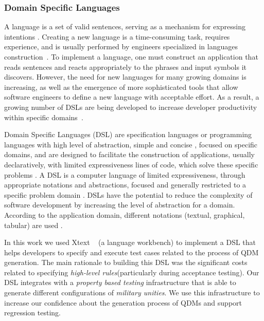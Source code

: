 \documentclass[twocolumn]{bmcart}%
\newcommand{\callers}{\emph{high-level rules}\xspace}
\begin{document}
\subsubsection{Domain Specific Languages}

A language is a set of valid sentences, serving as a mechanism for expressing intentions \cite{parr2010}. Creating a new language is a time-consuming task, requires experience, and is usually performed by engineers specialized in languages construction~\cite{karsai2014}. To implement a language, one must construct an application that reads sentences and reacts appropriately to the phrases and input symbols it discovers. However, the need for new languages for many growing domains is increasing, as well as the emergence of more sophisticated tools that allow software engineers to define a new language with acceptable effort. As a result, a growing number of DSLs are being developed to increase developer productivity within specific domains~\cite{karsai2014}. 


Domain Specific Languages (DSL) are specification languages or programming languages with high level of abstraction, simple and concise \cite{raja2010}, focused on specific domains, and are designed to facilitate the construction of applications, usually declaratively, with limited expressiveness lines of code, which solve these specific problems \cite{neeraj2017}. A DSL is a computer language of limited expressiveness, through appropriate notations and abstractions, focused and generally restricted to a specific problem domain \cite{fowler2013,vanDeursen2000}. DSLs have the potential to reduce the complexity of software development by increasing the level of abstraction for a domain. According to the application domain, different notations (textual, graphical, tabular) are used \cite{pfeiffer2008}.


In this work we used Xtext ~\cite{eysholdt2010} (a language workbench) to implement a DSL that helps developers to specify and execute test cases related to the process of QDM generation. The main rationale to building this DSL was the significant costs related to specifying \callers (particularly during acceptance testing).
Our DSL integrates with a \emph{property based testing} infrastructure that
is able to generate different configurations of \emph{military unities}. We use
this infrastructure to increase our confidence about the generation process of
QDMs and support regression testing.


\end{document}
